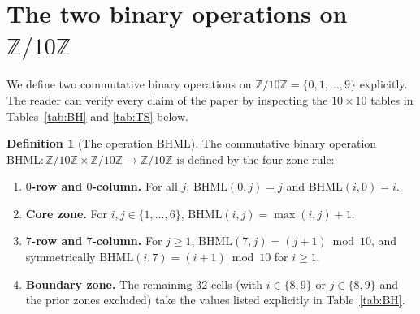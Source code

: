\documentclass[11pt,reqno]{amsart}
\theoremstyle{plain}
\theoremstyle{definition}
\newtheorem{definition}[theorem]{Definition}
\theoremstyle{remark}
\newcommand{\Z}{\mathbb{Z}}
\newcommand{\BH}{\mathrm{BHML}}
\newcommand{\Zten}{\Z/10\Z}
\begin{document}
\section{The two binary operations on $\Zten$}
\label{sec:tables}

We define two commutative binary operations on
$\Zten = \{0, 1, \ldots, 9\}$ explicitly. The reader can verify
every claim of the paper by inspecting the $10 \times 10$ tables
in Tables~\ref{tab:BH} and \ref{tab:TS} below.

\begin{definition}[The operation $\BH$]\label{def:BH}
The commutative binary operation $\BH : \Zten \times \Zten
\to \Zten$ is defined by the four-zone rule:
\begin{enumerate}\setlength\itemsep{2pt}
\item[\rm (R$_A$)] \textbf{$0$-row and $0$-column.} For all $j$,
$\BH(0, j) = j$ and $\BH(i, 0) = i$.
\item[\rm (R$_B$)] \textbf{Core zone.} For
$i, j \in \{1, \ldots, 6\}$, $\BH(i, j) = \max(i, j) + 1$.
\item[\rm (R$_7$)] \textbf{$7$-row and $7$-column.} For
$j \ge 1$, $\BH(7, j) = (j + 1) \bmod 10$, and symmetrically
$\BH(i, 7) = (i + 1) \bmod 10$ for $i \ge 1$.
\item[\rm (R$_{89}$)] \textbf{Boundary zone.} The remaining
$32$ cells (with $i \in \{8, 9\}$ or $j \in \{8, 9\}$ and
the prior zones excluded) take the values listed
explicitly in Table~\ref{tab:BH}.
\end{enumerate}
\end{definition}
\end{document}
